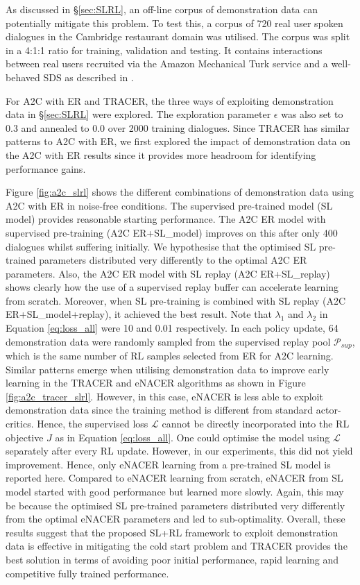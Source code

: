\documentclass[11pt,a4paper]{article}
\begin{document}
As discussed in \S \ref{sec:SLRL}, an off-line corpus of demonstration data can potentially mitigate this problem.  To test this, a corpus of 720 real user spoken dialogues in the Cambridge restaurant domain was utilised.
The corpus was split in a 4:1:1 ratio for training, validation and testing. It contains interactions between real users recruited via the Amazon Mechanical Turk service and a well-behaved SDS as described in .

For A2C with ER and TRACER, the three ways of exploiting demonstration data in \S \ref{sec:SLRL} were explored.
The exploration parameter $\epsilon$ was also set to 0.3 and annealed to 0.0 over 2000 training dialogues. 
Since TRACER has similar patterns to A2C with ER, we first explored the impact of demonstration data on the A2C with ER results since it provides more headroom for identifying performance gains.

Figure \ref{fig:a2c_slrl} shows the different combinations of demonstration data using A2C with ER in noise-free conditions. The supervised pre-trained model (SL model) provides reasonable starting performance. 
The A2C ER model with supervised pre-training (A2C ER+SL\_model) improves on this after only 400 dialogues whilst suffering initially.
We hypothesise that the optimised SL pre-trained parameters distributed very differently to the optimal A2C ER parameters.
Also, the A2C ER model with SL replay (A2C ER+SL\_replay) shows clearly how the use of a supervised replay buffer can accelerate learning from scratch. Moreover, when SL pre-training is combined with SL replay
(A2C ER+SL\_model+replay), it achieved the best result.
Note that $\lambda_1$ and $\lambda_2$ in Equation \ref{eq:loss_all} were 10 and 0.01 respectively. In each policy update, 64 demonstration data were randomly sampled from the supervised replay pool ${\mathcal{P}_{sup}}$, which is the same number of RL samples selected from ER for A2C learning. 
Similar patterns emerge when utilising demonstration data to improve early learning in the TRACER and eNACER algorithms as shown in Figure \ref{fig:a2c_tracer_slrl}. However, in this case, eNACER is less able to exploit demonstration data 
since the training method is different from standard actor-critics. Hence, the  supervised loss $\mathcal{L}$ cannot be directly incorporated into the RL objective $J$ as in Equation \ref{eq:loss_all}. One could optimise the model using $\mathcal{L}$ separately after every RL update. However, in our experiments, this did not yield improvement. Hence, only eNACER learning from a pre-trained SL model is reported here. Compared to eNACER learning from scratch, eNACER from SL model started with good performance but
learned more slowly.
Again, this may be because the optimised SL pre-trained parameters distributed very differently from the optimal eNACER parameters and led to sub-optimality.
Overall, these results suggest that the proposed SL+RL framework to exploit demonstration data is effective in mitigating the cold start problem and TRACER provides the best solution in terms of avoiding poor initial performance, rapid learning and competitive fully trained performance.
\end{document}
